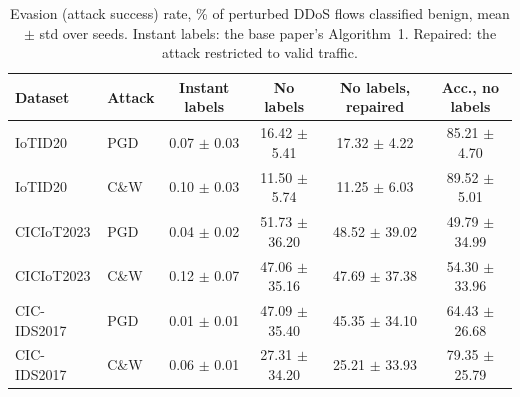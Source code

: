 \begin{table}[t]
\centering
\caption{Evasion (attack success) rate, \% of perturbed DDoS flows classified benign, mean $\pm$ std over seeds. Instant labels: the base paper's Algorithm~1. Repaired: the attack restricted to valid traffic.}
\label{tab:attack}
\footnotesize
\setlength{\tabcolsep}{3pt}
\begin{tabular}{llcccc}
\toprule
Dataset & Attack & Instant labels & No labels & No labels, repaired & Acc., no labels \\
\midrule
IoTID20 & PGD & 0.07 $\pm$ 0.03 & 16.42 $\pm$ 5.41 & 17.32 $\pm$ 4.22 & 85.21 $\pm$ 4.70 \\
IoTID20 & C\&W & 0.10 $\pm$ 0.03 & 11.50 $\pm$ 5.74 & 11.25 $\pm$ 6.03 & 89.52 $\pm$ 5.01 \\
CICIoT2023 & PGD & 0.04 $\pm$ 0.02 & 51.73 $\pm$ 36.20 & 48.52 $\pm$ 39.02 & 49.79 $\pm$ 34.99 \\
CICIoT2023 & C\&W & 0.12 $\pm$ 0.07 & 47.06 $\pm$ 35.16 & 47.69 $\pm$ 37.38 & 54.30 $\pm$ 33.96 \\
CIC-IDS2017 & PGD & 0.01 $\pm$ 0.01 & 47.09 $\pm$ 35.40 & 45.35 $\pm$ 34.10 & 64.43 $\pm$ 26.68 \\
CIC-IDS2017 & C\&W & 0.06 $\pm$ 0.01 & 27.31 $\pm$ 34.20 & 25.21 $\pm$ 33.93 & 79.35 $\pm$ 25.79 \\
\bottomrule
\end{tabular}
\end{table}
